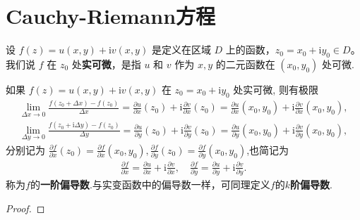 \documentclass[../../main.tex]{subfiles}%
\begin{document}
\section{Cauchy-Riemann方程}

\begin{definition}
设 \( f(z) = u(x,y) + \text{i}v(x,y) \) 是定义在区域 \( D \) 上的函数，\( z_0 = x_0 + \text{i}y_0 \in D \)。我们说 \( f \) 在 \( z_0 \) 处\textbf{实可微}，是指 \( u \) 和 \( v \) 作为 \( x,y \) 的二元函数在 \( (x_0,y_0) \) 处可微.
\end{definition}

\begin{theorem}
如果 $f(z)=u(x,y)+\mathrm{i}v(x,y)$ 在 $z_0=x_0+\mathrm{i}y_0$ 处实可微, 则有极限
\begin{align*}
\lim_{\Delta x\rightarrow 0} \frac{f(z_0+\Delta x)-f(z_0)}{\Delta x}=\frac{\partial u}{\partial x}(z_0)+\mathrm{i}\frac{\partial v}{\partial x}(z_0)=\frac{\partial u}{\partial x}(x_0,y_0)+\mathrm{i}\frac{\partial v}{\partial x}(x_0,y_0),
\end{align*}
\begin{align*}
\lim_{\Delta y\rightarrow 0} \frac{f(z_0+\mathrm{i}\Delta y)-f(z_0)}{\Delta y}=\frac{\partial u}{\partial y}(z_0)+\mathrm{i}\frac{\partial v}{\partial y}(z_0)=\frac{\partial u}{\partial y}(x_0,y_0)+\mathrm{i}\frac{\partial v}{\partial y}(x_0,y_0),
\end{align*}
分别记为 $\frac{\partial f}{\partial x}(z_0)=\frac{\partial f}{\partial x}(x_0,y_0),\frac{\partial f}{\partial y}(z_0)=\frac{\partial f}{\partial y}(x_0,y_0)$,也简记为
\begin{align*}
\frac{\partial f}{\partial x}=\frac{\partial u}{\partial x}+\mathrm{i}\frac{\partial v}{\partial x},\quad \frac{\partial f}{\partial y}=\frac{\partial u}{\partial y}+\mathrm{i}\frac{\partial v}{\partial y}.
\end{align*}
称为$f$的\textbf{一阶偏导数}.与实变函数中的偏导数一样，可同理定义$f$的$k$\textbf{阶偏导数}.
\end{theorem}
\begin{proof}



\end{proof}
\end{document}
